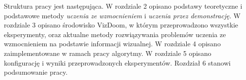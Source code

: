 Struktura pracy jest następująca. W rozdziale 2 opisano podstawy teoretyczne i podstawowe metody \textit{uczenia ze wzmocnieniem} i \textit{uczenia przez demonstrację}. W rozdziale 3 opisano środowisko VizDoom, w którym przeprowadzono wszystkie eksperymenty, oraz aktualne metody rozwiązywania problemów uczenia ze wzmocnieniem na podstawie informacji wizualnej. W rozdziale 4 opisano zaimplementowane w ramach pracy algorytmy. W rozdziale 5 opisano konfigurację i wyniki przeprowadzonych eksperymentów. Rozdział 6 stanowi podsumowanie pracy.




